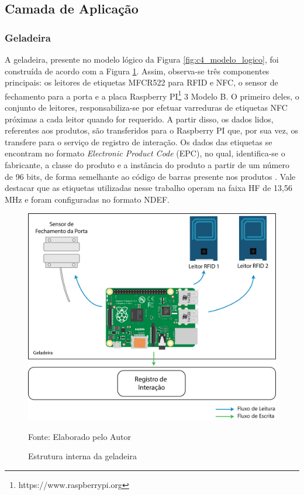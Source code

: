 \subsection{Camada de Aplicação}

\ProximoForaDoSumario 
\subsubsection{Geladeira}

A geladeira, presente no modelo lógico da Figura \ref{fig:c4_modelo_logico}, foi construída de acordo com a Figura \ref{fig:cap4_estr_geladeira}. Assim, observa-se três componentes principais: os leitores de etiquetas MFCR522 para RFID e NFC, o sensor de fechamento para a porta e a placa Raspberry PI\textsuperscript{\textregistered}\footnote{https://www.raspberrypi.org} 3 Modelo B. O primeiro deles, o conjunto de leitores, responsabiliza-se por efetuar varreduras de etiquetas NFC próximas a cada leitor quando for requerido. A partir disso, os dados lidos, referentes aos produtos, são transferidos para o Raspberry PI que, por sua vez, os transfere para o serviço de registro de interação. Os dados das etiquetas se encontram no formato \textit{Electronic Product Code} (EPC), no qual, identifica-se o fabricante, a classe do produto e a instância do produto a partir de um número de 96 bits, de forma semelhante ao código de barras presente nos produtos \cite{GS1BR2017}. Vale destacar que as etiquetas utilizadas nesse trabalho operam na faixa HF de 13,56 MHz e foram configuradas no formato NDEF.

\begin{figure}[htb]
    \caption{Estrutura interna da geladeira}
    \label{fig:cap4_estr_geladeira}
    \includegraphics[width=\textwidth]{figuras/c4_modelo-logico-hardware.png}
    
    \footnotesize{Fonte: Elaborado pelo Autor}
\end{figure}

